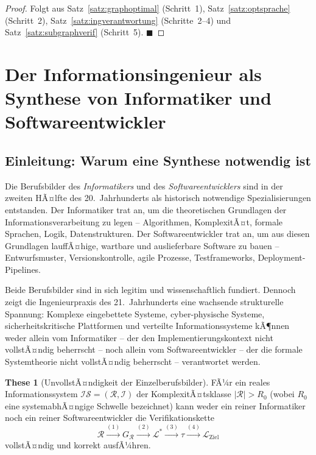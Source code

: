 ﻿\documentclass[a4paper,12pt]{report}
\theoremstyle{definition}
\newtheorem{these}{These}[section]
\begin{document}
\begin{proof}
Folgt aus Satz~\ref{satz:graphoptimal} (Schritt~1),
Satz~\ref{satz:optsprache} (Schritt~2),
Satz~\ref{satz:ingverantwortung} (Schritte~2--4) und
Satz~\ref{satz:subgraphverif} (Schritt~5). $\blacksquare$
\end{proof}


\section{Der Informationsingenieur als Synthese von Informatiker und Softwareentwickler}
\label{ch:synthese}
\label{sec:synthese}

\subsection{Einleitung: Warum eine Synthese notwendig ist}

Die Berufsbilder des \emph{Informatikers} und des \emph{Softwareentwicklers} sind in der
zweiten HÃ¤lfte des 20.~Jahrhunderts als historisch notwendige Spezialisierungen entstanden.
Der Informatiker trat an, um die theoretischen Grundlagen der Informationsverarbeitung zu
legen -- Algorithmen, KomplexitÃ¤t, formale Sprachen, Logik, Datenstrukturen. Der
Softwareentwickler trat an, um aus diesen Grundlagen lauffÃ¤hige, wartbare und auslieferbare
Software zu bauen -- Entwurfsmuster, Versionskontrolle, agile Prozesse, Testframeworks,
Deployment-Pipelines.

Beide Berufsbilder sind in sich legitim und wissenschaftlich fundiert. Dennoch zeigt die
Ingenieurpraxis des 21.~Jahrhunderts eine wachsende strukturelle Spannung: Komplexe
eingebettete Systeme, cyber-physische Systeme, sicherheitskritische Plattformen und
verteilte Informationssysteme kÃ¶nnen weder allein vom Informatiker -- der den
Implementierungskontext nicht vollstÃ¤ndig beherrscht -- noch allein vom Softwareentwickler
-- der die formale Systemtheorie nicht vollstÃ¤ndig beherrscht -- verantwortet werden.

\begin{these}[UnvollstÃ¤ndigkeit der Einzelberufsbilder]
\label{these:unvollst}
FÃ¼r ein reales Informationssystem $\mathcal{IS} = (\mathcal{R}, \mathcal{I})$ der
KomplexitÃ¤tsklasse $|\mathcal{R}| > R_0$ (wobei $R_0$ eine systemabhÃ¤ngige Schwelle
bezeichnet) kann weder ein reiner Informatiker noch ein reiner Softwareentwickler
die Verifikationskette
\[
  \mathcal{R}
  \xrightarrow{(1)} G_\mathcal{R}
  \xrightarrow{(2)} \mathcal{L}^*
  \xrightarrow{(3)} \tau
  \xrightarrow{(4)} \mathcal{L}_{\text{Ziel}}
\]
vollstÃ¤ndig und korrekt ausfÃ¼hren.
\end{these}
\end{document}
